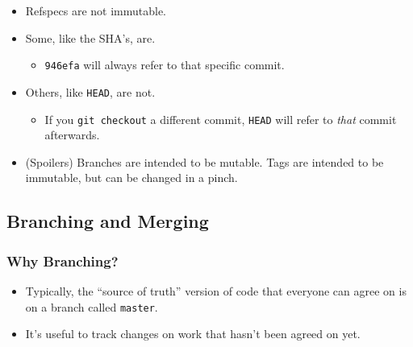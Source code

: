 \documentclass{beamer}
\begin{document}
\begin{frame}
  \begin{itemize}
  \item<1-> \alert{Refspecs are not immutable.}
  \item<2-> Some, like the SHA's, are.
    \begin{itemize}
    \item<3-> \texttt{946efa} will always refer to that specific commit.
    \end{itemize}
  \item<4-> Others, like \texttt{HEAD}, are not.
    \begin{itemize}
    \item<5-> If you \texttt{git checkout} a different commit, \texttt{HEAD} will refer to \textit{that} commit afterwards.
    \end{itemize}
  \item<6-> (Spoilers) Branches are intended to be mutable. Tags are intended to be immutable, but can be changed in a pinch.
  \end{itemize}
\end{frame}

\subsection{Branching and Merging}

\begin{frame}
  \frametitle{Why Branching?}
  
  \begin{itemize}
    \pause
  \item Typically, the ``source of truth'' version of code that everyone can agree on is on a branch called \texttt{master}.
    \pause
  \item It's useful to track changes on work that hasn't been agreed on yet.
  \end{itemize}
\end{frame}

\newcommand{\anoncommit}[2]{
  \node[circle, draw, minimum size=1cm, fill=green](#1) at #2{};
}
\newcommand{\selectedanoncommit}[2]{
  \node[circle, draw, minimum size=1cm, fill=green, thick](#1) at #2{};
}
\newcommand{\branch}[3]{
  \node[draw, fill=yellow](#1) at #2{\texttt{#3}};
}
\newcommand{\selectedbranch}[3]{
  \node[draw, fill=yellow, thick](#1) at #2{\texttt{#3}};
}
\end{document}
